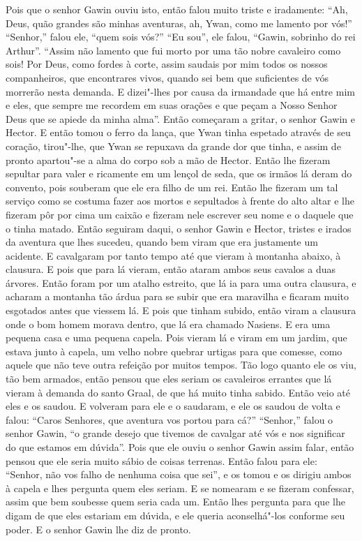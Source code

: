 Pois que o senhor Gawin ouviu isto, então falou muito triste e iradamente: “Ah,
Deus, quão grandes são minhas aventuras, ah, Ywan, como me lamento por vós!”
“Senhor,” falou ele, “quem sois vós?” “Eu sou”, ele falou, “Gawin, sobrinho do
rei Arthur”. “Assim não lamento que fui morto por uma tão nobre cavaleiro como
sois! Por Deus, como fordes à corte, assim saudais por mim todos os nossos
companheiros, que encontrares vivos, quando sei bem que suficientes de vós
morrerão nesta demanda. E dizei"-lhes por causa da irmandade que há entre mim e
eles, que sempre me recordem em suas orações e que peçam a Nosso Senhor Deus
que se apiede da minha alma”. Então começaram a gritar, o senhor Gawin e
Hector. E então tomou o ferro da lança, que Ywan tinha espetado através de seu
coração, tirou"-lhe, que Ywan se repuxava da grande dor que tinha, e assim de
pronto apartou"-se a alma do corpo sob a mão de Hector. Então lhe fizeram
sepultar para valer e ricamente em um lençol de seda, que os irmãos lá deram do
convento, pois souberam que ele era filho de um rei. Então lhe fizeram
um tal serviço como se costuma fazer aos mortos e sepultados à frente do alto
altar e lhe fizeram pôr por cima um caixão e fizeram nele escrever seu nome e o
daquele que o tinha matado. Então seguiram daqui, o senhor Gawin e Hector,
tristes e irados da aventura que lhes sucedeu, quando bem viram que era
justamente um acidente. E cavalgaram por tanto tempo até que vieram à montanha
abaixo, à clausura. E pois que para lá vieram, então ataram ambos seus cavalos
a duas árvores. Então foram por um atalho estreito, que lá ia para uma outra
clausura, e acharam a montanha tão árdua para se subir que era maravilha e
ficaram muito esgotados antes que viessem lá. E pois que tinham subido, então
viram a clausura onde o bom homem morava dentro, que lá era chamado Nasiens. E
era uma pequena casa e uma pequena capela. Pois vieram lá e viram em um jardim,
que estava junto à capela, um velho nobre quebrar urtigas para que comesse,
como aquele que não teve outra refeição por muitos tempos. Tão logo quanto ele
os viu, tão bem armados, então pensou que eles seriam os cavaleiros errantes
que lá vieram à demanda do santo Graal, de que há muito tinha sabido. Então
veio até eles e os saudou. E volveram para ele e o saudaram, e ele os saudou de
volta e falou: “Caros Senhores, que aventura vos portou para cá?” “Senhor,”
falou o senhor Gawin, “o grande desejo que tivemos de cavalgar até vós e nos
significar do que estamos em dúvida”. Pois que ele ouviu o senhor Gawin assim
falar, então pensou que ele seria muito sábio de coisas terrenas. Então falou
para ele: “Senhor, não vos falho de nenhuma coisa que sei”, e os tomou e os
dirigiu ambos à capela e lhes pergunta quem eles seriam. E se nomearam e se
fizeram confessar, assim que bem soubesse quem seria cada um. Então lhes
pergunta para que lhe digam de que eles estariam em dúvida, e ele queria
aconselhá"-los conforme seu poder. E o senhor Gawin lhe diz de pronto.

